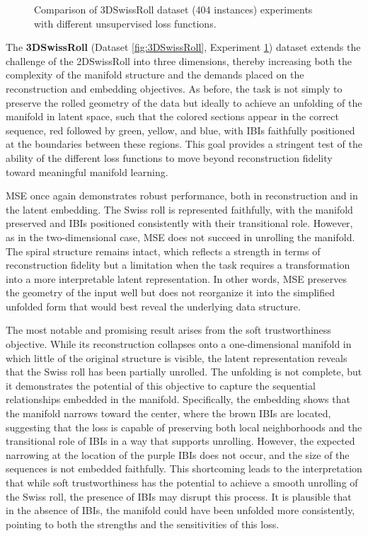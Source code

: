 \begin{figure}[htbp]
  \caption{Comparison of 3DSwissRoll dataset (404 instances) experiments with different unsupervised loss functions.}
  \label{fig:RQ2/3DSwissRoll}
\end{figure}

The \textbf{3DSwissRoll} (Dataset \ref{fig:3DSwissRoll}, Experiment \ref{fig:RQ2/3DSwissRoll}) dataset extends the challenge of the 2DSwissRoll into three dimensions, thereby increasing both the complexity of the manifold structure and the demands placed on the reconstruction and embedding objectives. As before, the task is not simply to preserve the rolled geometry of the data but ideally to achieve an unfolding of the manifold in latent space, such that the colored sections appear in the correct sequence, red followed by green, yellow, and blue, with IBIs faithfully positioned at the boundaries between these regions. This goal provides a stringent test of the ability of the different loss functions to move beyond reconstruction fidelity toward meaningful manifold learning.

MSE once again demonstrates robust performance, both in reconstruction and in the latent embedding. The Swiss roll is represented faithfully, with the manifold preserved and IBIs positioned consistently with their transitional role. However, as in the two-dimensional case, MSE does not succeed in unrolling the manifold. The spiral structure remains intact, which reflects a strength in terms of reconstruction fidelity but a limitation when the task requires a transformation into a more interpretable latent representation. In other words, MSE preserves the geometry of the input well but does not reorganize it into the simplified unfolded form that would best reveal the underlying data structure.

The most notable and promising result arises from the soft trustworthiness objective. While its reconstruction collapses onto a one-dimensional manifold in which little of the original structure is visible, the latent representation reveals that the Swiss roll has been partially unrolled. The unfolding is not complete, but it demonstrates the potential of this objective to capture the sequential relationships embedded in the manifold. Specifically, the embedding shows that the manifold narrows toward the center, where the brown IBIs are located, suggesting that the loss is capable of preserving both local neighborhoods and the transitional role of IBIs in a way that supports unrolling. However, the expected narrowing at the location of the purple IBIs does not occur, and the size of the sequences is not embedded faithfully. This shortcoming leads to the interpretation that while soft trustworthiness has the potential to achieve a smooth unrolling of the Swiss roll, the presence of IBIs may disrupt this process. It is plausible that in the absence of IBIs, the manifold could have been unfolded more consistently, pointing to both the strengths and the sensitivities of this loss.


